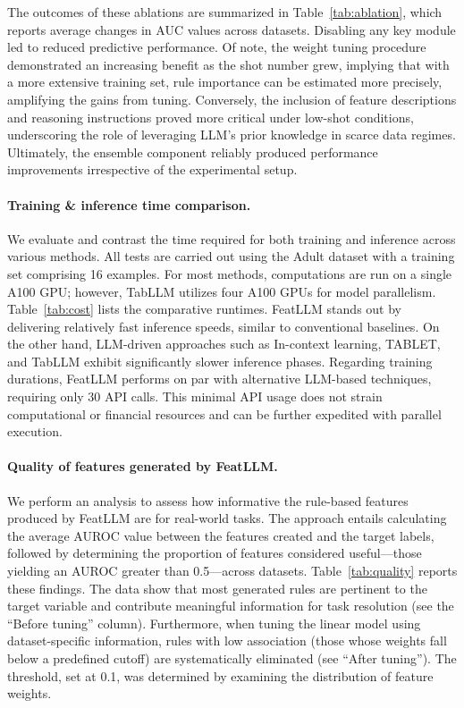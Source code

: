 The outcomes of these ablations are summarized in Table~\ref{tab:ablation}, which reports average changes in AUC values across datasets. Disabling any key module led to reduced predictive performance. Of note, the weight tuning procedure demonstrated an increasing benefit as the shot number grew, implying that with a more extensive training set, rule importance can be estimated more precisely, amplifying the gains from tuning. Conversely, the inclusion of feature descriptions and reasoning instructions proved more critical under low-shot conditions, underscoring the role of leveraging LLM's prior knowledge in scarce data regimes. Ultimately, the ensemble component reliably produced performance improvements irrespective of the experimental setup.

\vspace*{-0.12in}
\paragraph{Training \& inference time comparison.} We evaluate and contrast the time required for both training and inference across various methods. All tests are carried out using the Adult dataset with a training set comprising 16 examples. For most methods, computations are run on a single A100 GPU; however, TabLLM utilizes four A100 GPUs for model parallelism. Table~\ref{tab:cost} lists the comparative runtimes. \textsf{FeatLLM} stands out by delivering relatively fast inference speeds, similar to conventional baselines. On the other hand, LLM-driven approaches such as In-context learning, TABLET, and TabLLM exhibit significantly slower inference phases. Regarding training durations, \textsf{FeatLLM} performs on par with alternative LLM-based techniques, requiring only 30 API calls. This minimal API usage does not strain computational or financial resources and can be further expedited with parallel execution.

\vspace*{-0.12in}
\paragraph{Quality of features generated by \textsf{FeatLLM}.}
We perform an analysis to assess how informative the rule-based features produced by \textsf{FeatLLM} are for real-world tasks. The approach entails calculating the average AUROC value between the features created and the target labels, followed by determining the proportion of features considered useful—those yielding an AUROC greater than 0.5—across datasets. Table~\ref{tab:quality} reports these findings. The data show that most generated rules are pertinent to the target variable and contribute meaningful information for task resolution (see the ``Before tuning'' column). Furthermore, when tuning the linear model using dataset-specific information, rules with low association (those whose weights fall below a predefined cutoff) are systematically eliminated (see ``After tuning''). The threshold, set at 0.1, was determined by examining the distribution of feature weights.

